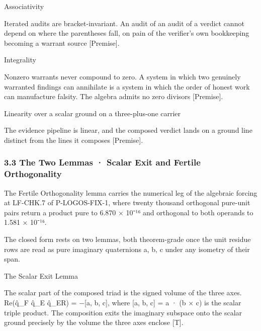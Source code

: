 \documentclass[10pt,twocolumn]{article}
\begin{document}
\begin{jbox}{Associativity}

Iterated audits are bracket-invariant. An audit of an audit of a verdict
cannot depend on where the parentheses fall, on pain of the verifier's
own bookkeeping becoming a warrant source {[}Premise{]}.

\end{jbox}

\begin{jbox}{Integrality}

Nonzero warrants never compound to zero. A system in which two genuinely
warranted findings can annihilate is a system in which the order of
honest work can manufacture falsity. The algebra admits no zero divisors
{[}Premise{]}.

\end{jbox}

\begin{jbox}{Linearity over a scalar ground on a three-plus-one carrier}

The evidence pipeline is linear, and the composed verdict lands on a
ground line distinct from the lines it composes {[}Premise{]}.

\end{jbox}

\hypertarget{the-two-lemmas-scalar-exit-and-fertile-orthogonality}{%
\subsubsection{3.3 The Two Lemmas · Scalar Exit and Fertile
Orthogonality}\label{the-two-lemmas-scalar-exit-and-fertile-orthogonality}}

The Fertile Orthogonality lemma carries the numerical leg of the
algebraic forcing at LF-CHK.7 of P-LOGOS-FIX-1, where twenty thousand
orthogonal pure-unit pairs return a product pure to 6.870 × 10⁻¹⁶ and
orthogonal to both operands to 1.581 × 10⁻¹⁶.

The closed form rests on two lemmas, both theorem-grade once the unit
residue rows are read as pure imaginary quaternions a, b, c under any
isometry of their span.

\begin{jbox}{The Scalar Exit Lemma}

The scalar part of the composed triad is the signed volume of the three
axes. Re(q̂\_F q̂\_E q̂\_ER) = −{[}a, b, c{]}, where {[}a, b, c{]} = a · (b
× c) is the scalar triple product. The composition exits the imaginary
subspace onto the scalar ground precisely by the volume the three axes
enclose {[}T{]}.

\end{jbox}
\end{document}
